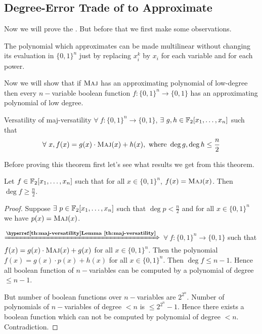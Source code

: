 \subsection{Degree-Error Trade of to Approximate }

Now we will prove the .  But before that we first make some observations.\begin{note}
	The polynomial which approximates  can be made multilinear without changing its evaluation in $\{0,1\}^n$ just by replacing $x_i^k$ by $x_i$ for each variable and for each power.  
\end{note}

Now we will show that if $\textsc{Maj}$ has an approximating polynomial of low-degree then every $n-$variable boolean function $f:\{0,1\}^n \to \{0,1\}$ has an approximating polynomial of low degree. 

\begin{Theorem}{Versatility of }{maj-versatility}
	$\forall\ f:\{0,1\}^n\to \{0,1\}$, $\exists\ g,h\in \mathbb{F}_2[x_1,\dots, x_n]$ such that $$\forall \ x, f(x) =g(x)\cdot \textsc{Maj}(x)+ h(x),\text{ where }\deg g, \deg h\leq \frac{n}{2}$$
\end{Theorem}
 Before proving this theorem first let's see what results we get from this theorem.
 
 \begin{lemma}{}{}
 	Let $f\in\mathbb{F}_2[x_1,\dots , x_n]$ such that for all $x\in \{0,1\}^n$, $f(x)=\textsc{Maj}(x)$. Then $\deg f\geq \frac{n}2$.
 \end{lemma}
\begin{proof}
	Suppose $\exists\ p\in \mathbb{F}_2[x_1,\dots, x_n]$ such that $\deg p< \frac{n}2$ and for all $x\in\{0,1\}^n$ we have $p(x)=\textsc{Maj}(x)$.\parinf\vspace*{2mm}
	
	$\xRightarrow{\textbf{\lmref{maj-versatility}}}$ $\forall\ f:\{0,1\}^n\to \{0,1\}$ such that $f(x)=g(x)\cdot \textsc{Maj}(x)+g(x)$ for all $x\in\{0,1\}^n$. Then the polynomial $f(x)=g(x)\cdot p(x)+h(x)$ for all $x\in\{0,1\}^n$. Then $\deg f\leq n-1$. Hence all boolean function of $n-$variables can be computed by a polynomial of degree $\leq n-1$. \parinn
	
	But number of boolean functions over $n-$variables are $2^{2^n}$. Number of polynomials of $n-$variables of degree $<n$ is $\leq 2^{2^{n}}-1$. Hence there exists a boolean function which can not be computed by polynomial of degree $< n$. Contradiction. 
\end{proof}

